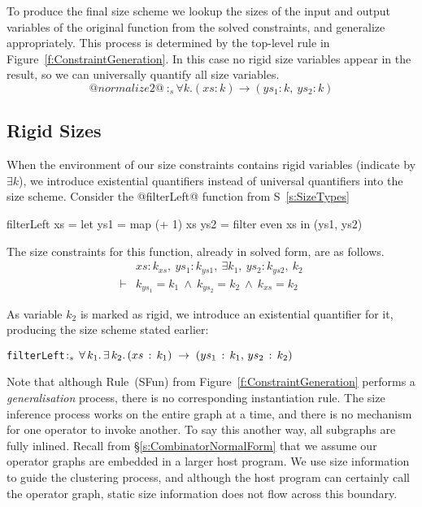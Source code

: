 To produce the final size scheme we lookup the sizes of the input and output variables of the original function from the solved constraints, and generalize appropriately. This process is determined by the top-level rule in Figure~\ref{f:ConstraintGeneration}. In this case no rigid size variables appear in the result, so we can universally quantify all size variables.
$$@normalize2@ ~:_s \forall k. (xs : k) \to (ys_1 : k,~ ys_2 : k)
$$




\subsection{Rigid Sizes}
When the environment of our size constraints contains rigid variables (indicate by $\exists k$), we introduce existential quantifiers instead of universal quantifiers into the size scheme. Consider the @filterLeft@ function from S~\ref{s:SizeTypes}
\begin{code}
      filterLeft xs
        = let ys1 = map (+ 1)   xs
              ys2 = filter even xs
          in (ys1, ys2)
\end{code}
The size constraints for this function, already in solved form, are as follows.
$$
\begin{array}{ll}
       & xs : k_{xs},~ ys_1 : k_{ys1},~ \exists k_1,~ ys_2 : k_{ys2},~ k_2
\\
\vdash &          k_{ys_1} = k_1
        ~\wedge~  k_{ys_2} = k_2
        ~\wedge~  k_{xs}   = k_2
\end{array}
$$

As variable $k_2$ is marked as rigid, we introduce an existential quantifier for it, producing the size scheme stated earlier:

\begin{alltt}
   filterLeft \(:\sb{s}\,\forall\,k\sb{1}.\,\exists\,k\sb{2}.\,(xs\,:\,k\sb{1})\;\to\;(ys\sb{1}\,:\,k\sb{1},\,ys\sb{2}\,:\,k\sb{2})\)
\end{alltt}

Note that although Rule~(SFun) from Figure~\ref{f:ConstraintGeneration} performs a \emph{generalisation} process, there is no corresponding instantiation rule. The size inference process works on the entire graph at a time, and there is no mechanism for one operator to invoke another. To say this another way, all subgraphs are fully inlined. Recall from \S\ref{s:CombinatorNormalForm} that we assume our operator graphs are embedded in a larger host program. We use size information to guide the clustering process, and although the host program can certainly call the operator graph, static size information does not flow across this boundary.


